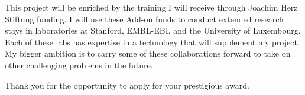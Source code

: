 \documentclass[11pt,a4paper,sans]{moderncv}        %
\begin{document}
This project will be enriched by the training I will receive through Joachim Herz Stiftung funding. I will use these Add-on funds to conduct extended research stays in laboratories at Stanford, EMBL-EBI, and the University of Luxembourg. Each of these labs has expertise in a technology that will supplement my project. My bigger ambition is to carry some of these collaborations forward to take on other challenging problems in the future.

Thank you for the opportunity to apply for your prestigious award.

\makeletterclosing
\end{document}
